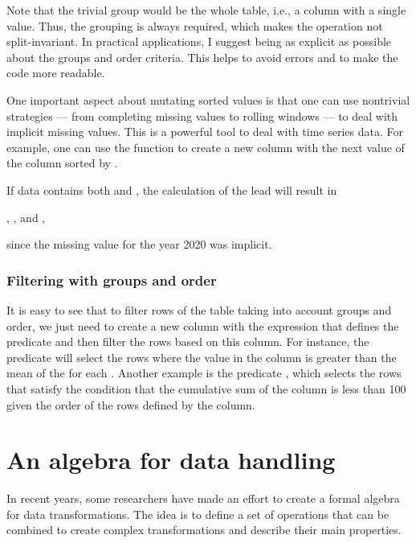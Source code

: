 Note that the trivial group would be the whole table, i.e., a column with a single value.
Thus, the grouping is always required, which makes the operation not split-invariant.
In practical applications, I suggest being as explicit as possible about the groups and
order criteria.  This helps to avoid errors and to make the code more readable.

One important aspect about mutating sorted values is that one can use nontrivial
strategies --- from completing missing values to rolling windows --- to deal with implicit
missing values.  This is a powerful tool to deal with time series data. For example, one
can use the  function to create a new column with the next value of the
 column sorted by .

If data contains both  and
, the calculation of the lead will result in
\begin{center}
  , , and ,
\end{center}
since the missing value for the year 2020 was implicit.

\subsubsection{Filtering with groups and order}

It is easy to see that to filter rows of the table taking into account groups and order,
we just need to create a new column with the expression that defines the predicate and
then filter the rows based on this column.  For instance, the predicate  will select the rows where the value in the  column is greater
than the mean of the  for each . Another example is the predicate
, which selects the rows that satisfy the condition
that the cumulative sum of the  column is less than 100 given the order of the
rows defined by the  column.

\section{An algebra for data handling}

In recent years, some researchers have made an effort to create a formal algebra for data
transformations.  The idea is to define a set of operations that can be combined to create
complex transformations and describe their main properties.

